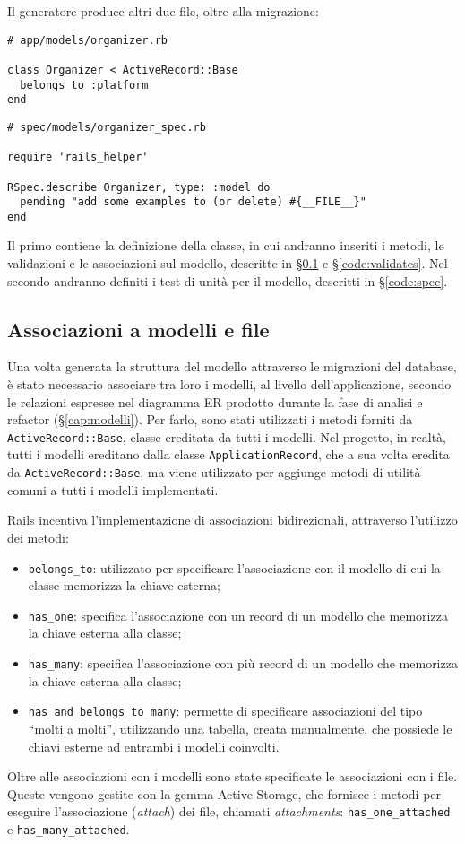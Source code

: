 Il generatore produce altri due file, oltre alla migrazione:
\begin{verbatim}
# app/models/organizer.rb

class Organizer < ActiveRecord::Base
  belongs_to :platform
end
\end{verbatim}

\begin{verbatim}
# spec/models/organizer_spec.rb

require 'rails_helper'

RSpec.describe Organizer, type: :model do
  pending "add some examples to (or delete) #{__FILE__}"
end
\end{verbatim}
Il primo contiene la definizione della classe, in cui andranno inseriti i metodi, le validazioni e le associazioni sul modello, descritte in \S \ref{code:association} e \S \ref{code:validates}. Nel secondo andranno definiti i test di unità per il modello, descritti in \S \ref{code:spec}.

\subsection{Associazioni a modelli e file} \label{code:association}
Una volta generata la struttura del modello attraverso le migrazioni del database, è stato necessario associare tra loro i modelli, al livello dell'applicazione, secondo le relazioni espresse nel diagramma ER prodotto durante la fase di analisi e refactor (\S \ref{cap:modelli}). Per farlo, sono stati utilizzati i metodi forniti da \verb|ActiveRecord::Base|, classe ereditata da tutti i modelli. Nel progetto, in realtà, tutti i modelli ereditano dalla classe \verb|ApplicationRecord|, che a sua volta eredita da \verb|ActiveRecord::Base|, ma viene utilizzato per aggiunge metodi di utilità comuni a tutti i modelli implementati.

Rails incentiva l'implementazione di associazioni bidirezionali, attraverso l'utilizzo dei metodi:
\begin{itemize}
	\item \verb|belongs_to|: utilizzato per specificare l'associazione con il modello di cui la classe memorizza la chiave esterna;
	\item \verb|has_one|: specifica l'associazione con un record di un modello che memorizza la chiave esterna alla classe;
	\item \verb|has_many|: specifica l'associazione con più record di un modello che memorizza la chiave esterna alla classe;
	\item \verb|has_and_belongs_to_many|: permette di specificare associazioni del tipo ``molti a molti'', utilizzando una tabella, creata manualmente, che possiede le chiavi esterne ad entrambi i modelli coinvolti.
\end{itemize}
Oltre alle associazioni con i modelli sono state specificate le associazioni con i file. Queste vengono gestite con la gemma Active Storage, che fornisce i metodi per eseguire l'associazione (\emph{attach}) dei file, chiamati \emph{attachments}: \verb|has_one_attached| e \verb|has_many_attached|.

